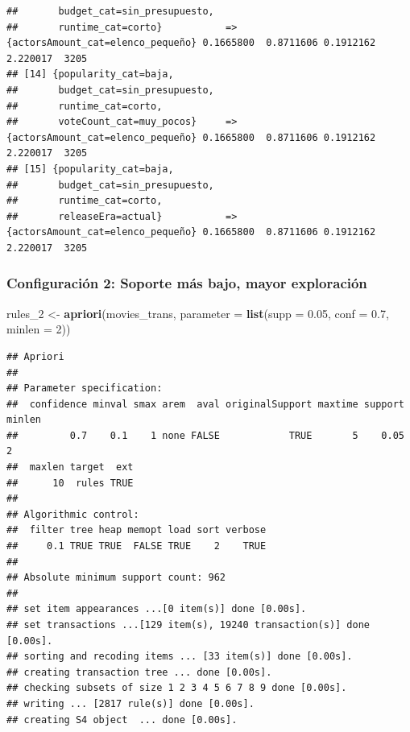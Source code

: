 \documentclass[
]{article}
\newenvironment{Shaded}{\begin{snugshade}}{\end{snugshade}}
\newcommand{\AttributeTok}[1]{\textcolor[rgb]{0.13,0.29,0.53}{#1}}
\newcommand{\DecValTok}[1]{\textcolor[rgb]{0.00,0.00,0.81}{#1}}
\newcommand{\FloatTok}[1]{\textcolor[rgb]{0.00,0.00,0.81}{#1}}
\newcommand{\FunctionTok}[1]{\textcolor[rgb]{0.13,0.29,0.53}{\textbf{#1}}}
\newcommand{\NormalTok}[1]{#1}
\newcommand{\OtherTok}[1]{\textcolor[rgb]{0.56,0.35,0.01}{#1}}
\begin{document}
\begin{verbatim}
##       budget_cat=sin_presupuesto,                                                                                    
##       runtime_cat=corto}           => {actorsAmount_cat=elenco_pequeño} 0.1665800  0.8711606 0.1912162 2.220017  3205
## [14] {popularity_cat=baja,                                                                                           
##       budget_cat=sin_presupuesto,                                                                                    
##       runtime_cat=corto,                                                                                             
##       voteCount_cat=muy_pocos}     => {actorsAmount_cat=elenco_pequeño} 0.1665800  0.8711606 0.1912162 2.220017  3205
## [15] {popularity_cat=baja,                                                                                           
##       budget_cat=sin_presupuesto,                                                                                    
##       runtime_cat=corto,                                                                                             
##       releaseEra=actual}           => {actorsAmount_cat=elenco_pequeño} 0.1665800  0.8711606 0.1912162 2.220017  3205
\end{verbatim}

\subsubsection{Configuración 2: Soporte más bajo, mayor
exploración}\label{configuraciuxf3n-2-soporte-muxe1s-bajo-mayor-exploraciuxf3n}

\begin{Shaded}
\begin{Highlighting}[]
\NormalTok{rules\_2 }\OtherTok{\textless{}{-}} \FunctionTok{apriori}\NormalTok{(movies\_trans,}
                   \AttributeTok{parameter =} \FunctionTok{list}\NormalTok{(}\AttributeTok{supp =} \FloatTok{0.05}\NormalTok{, }\AttributeTok{conf =} \FloatTok{0.7}\NormalTok{, }\AttributeTok{minlen =} \DecValTok{2}\NormalTok{))}
\end{Highlighting}
\end{Shaded}

\begin{verbatim}
## Apriori
## 
## Parameter specification:
##  confidence minval smax arem  aval originalSupport maxtime support minlen
##         0.7    0.1    1 none FALSE            TRUE       5    0.05      2
##  maxlen target  ext
##      10  rules TRUE
## 
## Algorithmic control:
##  filter tree heap memopt load sort verbose
##     0.1 TRUE TRUE  FALSE TRUE    2    TRUE
## 
## Absolute minimum support count: 962 
## 
## set item appearances ...[0 item(s)] done [0.00s].
## set transactions ...[129 item(s), 19240 transaction(s)] done [0.00s].
## sorting and recoding items ... [33 item(s)] done [0.00s].
## creating transaction tree ... done [0.00s].
## checking subsets of size 1 2 3 4 5 6 7 8 9 done [0.00s].
## writing ... [2817 rule(s)] done [0.00s].
## creating S4 object  ... done [0.00s].
\end{verbatim}
\end{document}
